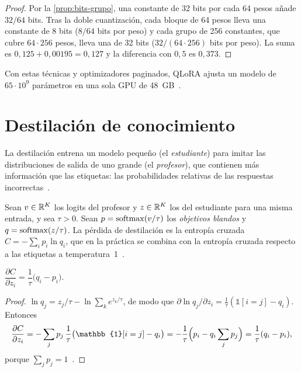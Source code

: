 \begin{proof}
Por la \cref{prop:bits-grupo}, una constante de 32 bits por cada 64 pesos añade $32/64$ bits. Tras la doble cuantización, cada bloque de 64 pesos lleva una constante de 8 bits ($8/64$ bits por peso) y cada grupo de 256 constantes, que cubre $64\cdot 256$ pesos, lleva una de 32 bits ($32/(64\cdot 256)$ bits por peso). La suma es $0{,}125+0{,}00195=0{,}127$ y la diferencia con $0{,}5$ es $0{,}373$.
\end{proof}

Con estas técnicas y optimizadores paginados, QLoRA ajusta un modelo de $65\cdot 10^{9}$ parámetros en una sola GPU de 48~GB~\cite{qlora}.

\section{Destilación de conocimiento}

La destilación entrena un modelo pequeño (el \emph{estudiante}) para imitar las distribuciones de salida de uno grande (el \emph{profesor}), que contienen más información que las etiquetas: las probabilidades relativas de las respuestas incorrectas~\cite[§2]{hinton}.

\begin{definicion}\label{def:destilacion}
Sean $v\in\mathbb{R}^{K}$ los logits del profesor y $z\in\mathbb{R}^{K}$ los del estudiante para una misma entrada, y sea $\tau>0$. Sean $p=\operatorname{softmax}(v/\tau)$ los \emph{objetivos blandos} y $q=\operatorname{softmax}(z/\tau)$. La pérdida de destilación es la entropía cruzada $C=-\sum_{i}p_i\ln q_i$, que en la práctica se combina con la entropía cruzada respecto a las etiquetas a temperatura~1~\cite[§2, ec.~1]{hinton}.
\end{definicion}

\begin{proposicion}\label{prop:grad-destilacion}
$\dfrac{\partial C}{\partial z_i}=\dfrac{1}{\tau}\bigl(q_i-p_i\bigr)$.
\end{proposicion}

\begin{proof}
$\ln q_j=z_j/\tau-\ln\sum_k e^{z_k/\tau}$, de modo que $\partial\ln q_j/\partial z_i=\frac1\tau(\mathbb{1}[i=j]-q_i)$. Entonces
\[
\frac{\partial C}{\partial z_i}=-\sum_j p_j\,\frac{1}{\tau}\bigl(\mathbb{1}[i=j]-q_i\bigr)=-\frac{1}{\tau}\Bigl(p_i-q_i\sum_j p_j\Bigr)=\frac{1}{\tau}(q_i-p_i),
\]
porque $\sum_jp_j=1$~\cite[§2, ec.~2]{hinton}.
\end{proof}

